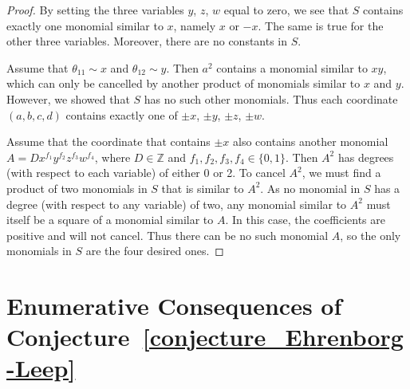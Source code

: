 \documentclass[12pt,table]{article}
\theoremstyle{definition}
\theoremstyle{remark}
\newcommand{\Zzz}{\mathbb Z}
\numberwithin{equation}{section}
\begin{document}
\begin{proof}
By setting the three variables $y$, $z$, $w$ equal to zero, we see that $ S $ contains
exactly one monomial similar to $ x $, namely $ x$ or $ -x $. The same is true for
the other three variables. Moreover, there are no constants in $ S $.

Assume that $\theta_{11} \sim x$ and $\theta_{12} \sim y$.
Then $a^2$ contains
a monomial similar to $ xy $, which can only be cancelled by another product of monomials similar to
$ x $ and $y$. However, we showed that $ S $ has no such other monomials.
Thus each coordinate $ (a, b, c, d) $ contains exactly one of $ \pm x$, $\pm y$, $\pm z$, $\pm w $.


Assume that the coordinate that contains $ \pm x $ also contains
another monomial $ A = Dx^{f_1}y^{f_2}z^{f_3}w^{f_4}$, where $ D \in \Zzz $
and $ f_1,f_2,f_3,f_4 \in \{0,1\} $. Then $ A^2 $ has degrees (with respect to
each variable) of either 0 or 2. To cancel $ A^2 $, we must find a product of two
monomials in $ S $ that is similar to $ A^2 $. As no monomial in $ S $ has a degree
(with respect to any variable) of two, any monomial similar to $ A^2 $ must itself be
a square of a monomial similar to $ A $. In this case, the coefficients are
positive and will not cancel. Thus there can be no such monomial $ A $, so the only monomials
in $ S $ are the four desired ones.
\end{proof}

\section{Enumerative Consequences of Conjecture~\ref{conjecture_Ehrenborg-Leep}} 
\end{document}
